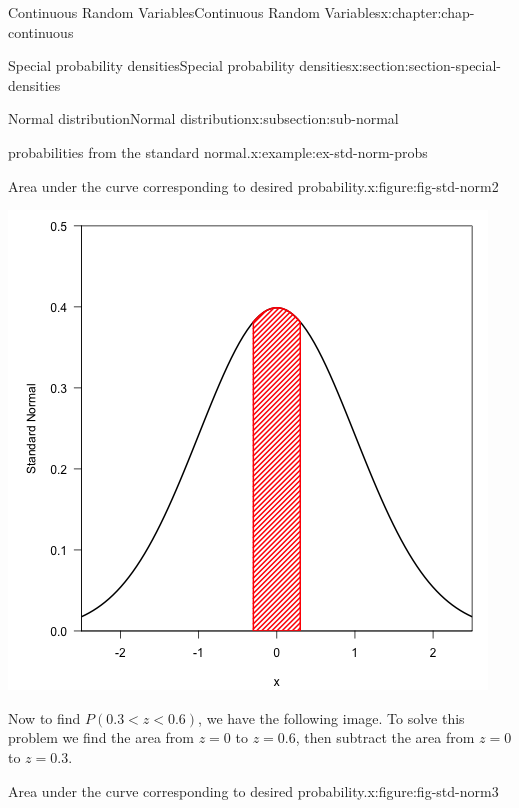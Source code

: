 \documentclass[oneside,10pt,]{book}
\numberwithin{equation}{section}
\newcommand{\lt}{<}
\begin{document}
\begin{chapterptx}{Continuous Random Variables}{}{Continuous Random Variables}{}{}{x:chapter:chap-continuous}
\begin{sectionptx}{Special probability densities}{}{Special probability densities}{}{}{x:section:section-special-densities}
\begin{subsectionptx}{Normal distribution}{}{Normal distribution}{}{}{x:subsection:sub-normal}
\begin{example}{probabilities from the standard normal.}{x:example:ex-std-norm-probs}
\begin{figureptx}{Area under the curve corresponding to desired probability.}{x:figure:fig-std-norm2}{}
\begin{image}{0.25}{0.5}{0.25}
\includegraphics[width=\linewidth]{./images/std_norm2.png}
\end{image}%
\tcblower
\end{figureptx}%
Now to find \(P(0.3 \lt z \lt 0.6)\), we have the following image. To solve this problem we find the area from \(z=0\) to \(z=0.6\), then subtract the area from \(z=0\) to \(z=0.3\).%
\begin{figureptx}{Area under the curve corresponding to desired probability.}{x:figure:fig-std-norm3}{}%
\begin{image}{0.25}{0.5}{0.25}%

\end{image}
\end{figureptx}
\end{example}
\end{subsectionptx}
\end{sectionptx}
\end{chapterptx}
\end{document}
